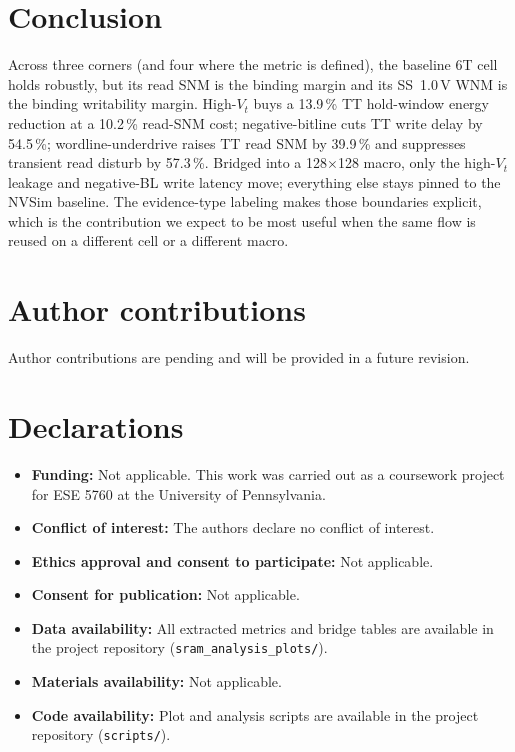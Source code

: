 \documentclass[pdflatex,sn-mathphys-num,iicol]{sn-jnl}%
\theoremstyle{thmstyleone}%
\theoremstyle{thmstyletwo}%
\theoremstyle{thmstylethree}%
\begin{document}
\section{Conclusion}\label{sec:conclusion}

Across three corners (and four where the metric is defined), the baseline 6T cell holds robustly, but its read SNM is the binding margin and its SS~1.0\,V WNM is the binding writability margin. High-$V_t$ buys a 13.9\,\% TT hold-window energy reduction at a 10.2\,\% read-SNM cost; negative-bitline cuts TT write delay by 54.5\,\%; wordline-underdrive raises TT read SNM by 39.9\,\% and suppresses transient read disturb by 57.3\,\%. Bridged into a 128$\times$128 macro, only the high-$V_t$ leakage and negative-BL write latency move; everything else stays pinned to the NVSim baseline. The evidence-type labeling makes those boundaries explicit, which is the contribution we expect to be most useful when the same flow is reused on a different cell or a different macro.

\backmatter

\section*{Author contributions}
Author contributions are pending and will be provided in a future revision.

\section*{Declarations}
\begin{itemize}
    \item \textbf{Funding:} Not applicable. This work was carried out as a coursework project for ESE 5760 at the University of Pennsylvania.
    \item \textbf{Conflict of interest:} The authors declare no conflict of interest.
    \item \textbf{Ethics approval and consent to participate:} Not applicable.
    \item \textbf{Consent for publication:} Not applicable.
    \item \textbf{Data availability:} All extracted metrics and bridge tables are available in the project repository (\texttt{sram\_analysis\_plots/}).
    \item \textbf{Materials availability:} Not applicable.
    \item \textbf{Code availability:} Plot and analysis scripts are available in the project repository (\texttt{scripts/}).
\end{itemize}
\end{document}
